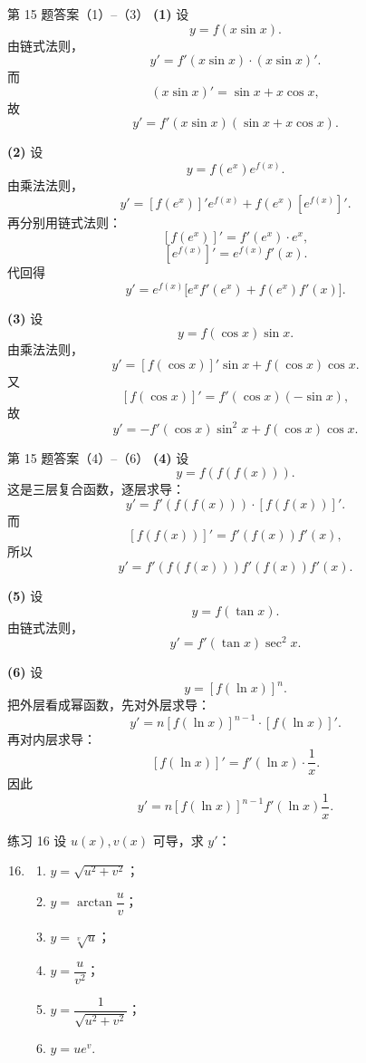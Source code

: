 ﻿\documentclass[aspectratio=169,11pt]{ctexbeamer}
\begin{document}
\begin{frame}[allowframebreaks]{第 15 题答案（1）--（3）}
\scriptsize
\textbf{(1)} 设
\[
y=f(x\sin x).
\]
由链式法则，
\[
y'=f'(x\sin x)\cdot (x\sin x)'.
\]
而
\[
(x\sin x)'=\sin x+x\cos x,
\]
故
\[
y'=f'(x\sin x)(\sin x+x\cos x).
\]

\textbf{(2)} 设
\[
y=f(e^x)e^{f(x)}.
\]
由乘法法则，
\[
y'=[f(e^x)]'e^{f(x)}+f(e^x)[e^{f(x)}]'.
\]
再分别用链式法则：
\[
[f(e^x)]'=f'(e^x)\cdot e^x,
\]
\[
[e^{f(x)}]'=e^{f(x)}f'(x).
\]
代回得
\[
y'=e^{f(x)}\bigl[e^x f'(e^x)+f(e^x)f'(x)\bigr].
\]

\textbf{(3)} 设
\[
y=f(\cos x)\sin x.
\]
由乘法法则，
\[
y'=[f(\cos x)]'\sin x+f(\cos x)\cos x.
\]
又
\[
[f(\cos x)]'=f'(\cos x)(-\sin x),
\]
故
\[
y'=-f'(\cos x)\sin^2x+f(\cos x)\cos x.
\]
\end{frame}

\begin{frame}[allowframebreaks]{第 15 题答案（4）--（6）}
\scriptsize
\textbf{(4)} 设
\[
y=f(f(f(x))).
\]
这是三层复合函数，逐层求导：
\[
y'=f'(f(f(x)))\cdot [f(f(x))]'.
\]
而
\[
[f(f(x))]'=f'(f(x))f'(x),
\]
所以
\[
y'=f'(f(f(x)))f'(f(x))f'(x).
\]

\textbf{(5)} 设
\[
y=f(\tan x).
\]
由链式法则，
\[
y'=f'(\tan x)\sec^2x.
\]

\textbf{(6)} 设
\[
y=[f(\ln x)]^n.
\]
把外层看成幂函数，先对外层求导：
\[
y'=n[f(\ln x)]^{n-1}\cdot [f(\ln x)]'.
\]
再对内层求导：
\[
[f(\ln x)]'=f'(\ln x)\cdot \frac1x.
\]
因此
\[
y'=n[f(\ln x)]^{n-1}f'(\ln x)\frac1x.
\]
\end{frame}

\begin{frame}{练习 16}
\scriptsize
设 $u(x),v(x)$ 可导，求 $y'$：
\begin{enumerate}
\setcounter{enumi}{15}
\item
\begin{enumerate}
\item $y=\sqrt{u^2+v^2}$；
\item $y=\arctan\dfrac{u}{v}$；
\item $y=\sqrt[v]{u}$；
\item $y=\dfrac{u}{v^2}$；
\item $y=\dfrac{1}{\sqrt{u^2+v^2}}$；
\item $y=ue^v$.
\end{enumerate}
\end{enumerate}
\end{frame}
\end{document}
